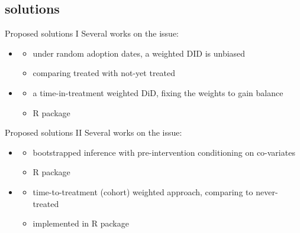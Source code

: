 \documentclass[aspectratio=169]{beamer}
\begin{document}
	\subsection{solutions}
		\begin{frame}{Proposed solutions I}
			Several works on the issue:
			\\ \vspace*{.25cm}
			\begin{itemize}
				\item<2-> \cite{Athey2020}
					\begin{itemize}
						\item under random adoption dates, a weighted DID is unbiased
						\item comparing treated with not-yet treated
					\end{itemize}
				\item<3-> \cite{Goodman-Bacon2018}
					\begin{itemize}
						\item a time-in-treatment weighted DiD, fixing the weights to gain balance
						\item R package \href{https://cran.r-project.org/web/packages/bacondecomp/index.html}{\underline{}}
					\end{itemize}
			\end{itemize}
		\end{frame}

		\begin{frame}{Proposed solutions II}
			Several works on the issue:
			\\ \vspace*{.25cm}
			\begin{itemize}
				\item<2-> \cite{Callaway2020}
					\begin{itemize}
						\item bootstrapped inference with pre-intervention conditioning on co-variates
						\item R package \href{https://cran.r-project.org/web/packages/did/vignettes/did-basics.html}{\underline{}}
					\end{itemize}
				\item<3-> \cite{Sun2020a}
					\begin{itemize}
						\item time-to-treatment (cohort) weighted approach, comparing to never-treated
						\item implemented in \href{https://cran.r-project.org/web/packages/fixest/vignettes/fixest_walkthrough.html}{\underline{}} R package
					\end{itemize}
			\end{itemize}
		\end{frame}
\end{document}

